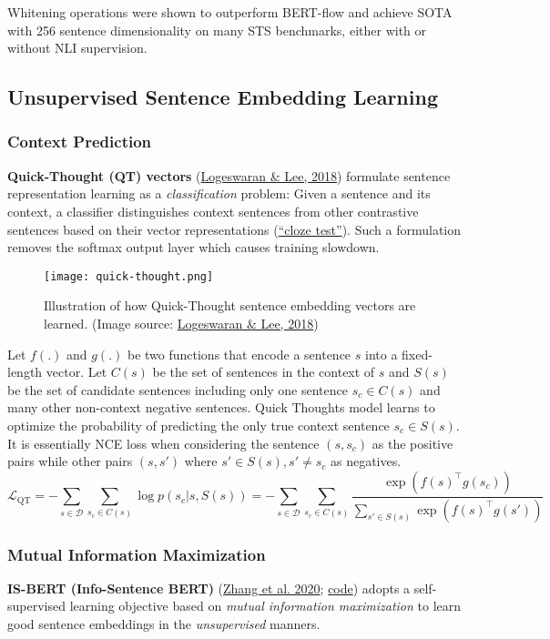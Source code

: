 \documentclass[12pt]{article}
\begin{document}
Whitening operations were shown to outperform BERT-flow and achieve SOTA with 256 sentence dimensionality on many STS benchmarks, either with or without NLI supervision.

\subsection{Unsupervised Sentence Embedding Learning}

\subsubsection{Context Prediction}
\textbf{Quick-Thought (QT) vectors} (\href{https://arxiv.org/abs/1803.02893}{Logeswaran \& Lee, 2018}) formulate sentence representation learning as a \emph{classification} problem: Given a sentence and its context, a classifier distinguishes context sentences from other contrastive sentences based on their vector representations (\href{https://lilianweng.github.io/posts/2019-01-31-lm/#MLM}{``cloze test''}). Such a formulation removes the softmax output layer which causes training slowdown.

\begin{figure}[H]
    \centering
    \texttt{[image: quick-thought.png]}
    \caption{Illustration of how Quick-Thought sentence embedding vectors are learned. (Image source: \href{https://arxiv.org/abs/1803.02893}{Logeswaran \& Lee, 2018})}
\end{figure}

Let $f(.)$ and $g(.)$ be two functions that encode a sentence $s$ into a fixed-length vector. Let $C(s)$ be the set of sentences in the context of $s$ and $S(s)$ be the set of candidate sentences including only one sentence $s_c \in C(s)$ and many other non-context negative sentences. Quick Thoughts model learns to optimize the probability of predicting the only true context sentence $s_c \in S(s)$. It is essentially NCE loss when considering the sentence $(s, s_c)$ as the positive pairs while other pairs $(s, s')$ where $s' \in S(s), s'\neq s_c$ as negatives.
\[
\mathcal{L}_\text{QT} 
= - \sum_{s \in \mathcal{D}} \sum_{s_c \in C(s)} \log p(s_c \vert s, S(s)) 
= - \sum_{s \in \mathcal{D}} \sum_{s_c \in C(s)}\frac{\exp(f(s)^\top g(s_c))}{\sum_{s'\in S(s)} \exp(f(s)^\top g(s'))}
\]

\subsubsection{Mutual Information Maximization}
\textbf{IS-BERT (Info-Sentence BERT)} (\href{https://arxiv.org/abs/2009.12061}{Zhang et al. 2020}; \href{https://github.com/yanzhangnlp/IS-BERT}{code}) adopts a self-supervised learning objective based on \emph{mutual information maximization} to learn good sentence embeddings in the \emph{unsupervised} manners.
\end{document}
